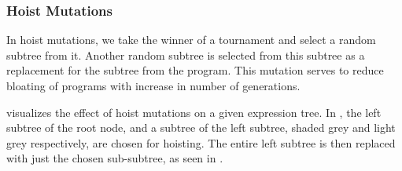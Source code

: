 \subsubsection{Hoist Mutations}
\label{subsec:hoist}
In hoist mutations, we take the winner of a tournament and select a random subtree from it. Another random subtree is selected from this subtree as a replacement for the subtree from the program. 
This mutation serves to reduce bloating of programs with increase in number of generations. 

 visualizes the effect of hoist mutations on a given expression tree. In , the left subtree of the root node, and a subtree of the left subtree, shaded grey and light grey respectively, are chosen for hoisting. The entire left subtree is then replaced with just the chosen sub-subtree, as seen in .


